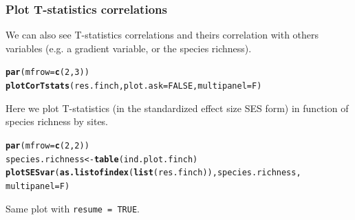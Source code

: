 \documentclass[12pt]{article}\usepackage[]{graphicx}\usepackage[]{color}
\makeatletter
\newcommand{\hlnum}[1]{\textcolor[rgb]{0.686,0.059,0.569}{#1}}%
\newcommand{\hlstd}[1]{\textcolor[rgb]{0.345,0.345,0.345}{#1}}%
\newcommand{\hlkwb}[1]{\textcolor[rgb]{0.69,0.353,0.396}{#1}}%
\newcommand{\hlkwc}[1]{\textcolor[rgb]{0.333,0.667,0.333}{#1}}%
\newcommand{\hlkwd}[1]{\textcolor[rgb]{0.737,0.353,0.396}{\textbf{#1}}}%
\newenvironment{kframe}{%
 \def\at@end@of@kframe{}%
 \ifinner\ifhmode%
  \def\at@end@of@kframe{\end{minipage}}%
  \begin{minipage}{\columnwidth}%
 \fi\fi%
 \def\FrameCommand##1{\hskip\@totalleftmargin \hskip-\fboxsep
 \colorbox{shadecolor}{##1}\hskip-\fboxsep
     \hskip-\linewidth \hskip-\@totalleftmargin \hskip\columnwidth}%
 \MakeFramed {\advance\hsize-\width
   \@totalleftmargin\z@ \linewidth\hsize
   \@setminipage}}%
 {\par\unskip\endMakeFramed%
 \at@end@of@kframe}
\newenvironment{knitrout}{}{} %
\makeatother
\begin{document}
\newpage

\subsubsection{Plot T-statistics correlations}

We can also see T-statistics correlations and theirs correlation with others variables (e.g. a gradient variable, or the species richness).

\begin{knitrout}
\color{fgcolor}\begin{kframe}
\begin{alltt}
\hlkwd{par}\hlstd{(}\hlkwc{mfrow} \hlstd{=} \hlkwd{c}\hlstd{(}\hlnum{2}\hlstd{,}\hlnum{3}\hlstd{))}
\hlkwd{plotCorTstats}\hlstd{(res.finch,} \hlkwc{plot.ask} \hlstd{=} \hlnum{FALSE}\hlstd{,} \hlkwc{multipanel} \hlstd{= F)}
\end{alltt}


{\ttfamily\noindent\bfseries{}}\end{kframe}
\end{knitrout}

Here we plot T-statistics (in the standardized effect size SES form) in function of species richness by sites.

\begin{knitrout}
\color{fgcolor}\begin{kframe}
\begin{alltt}
\hlkwd{par}\hlstd{(}\hlkwc{mfrow} \hlstd{=} \hlkwd{c}\hlstd{(}\hlnum{2}\hlstd{,}\hlnum{2}\hlstd{))}
\hlstd{species.richness}\hlkwb{<-}\hlkwd{table}\hlstd{(ind.plot.finch)}
\hlkwd{plotSESvar}\hlstd{(}\hlkwd{as.listofindex}\hlstd{(}\hlkwd{list}\hlstd{(res.finch)), species.richness,}
       \hlkwc{multipanel} \hlstd{= F)}
\end{alltt}


{\ttfamily\noindent\bfseries{}}\end{kframe}
\end{knitrout}

Same plot with \texttt{resume = TRUE}.
\end{document}
